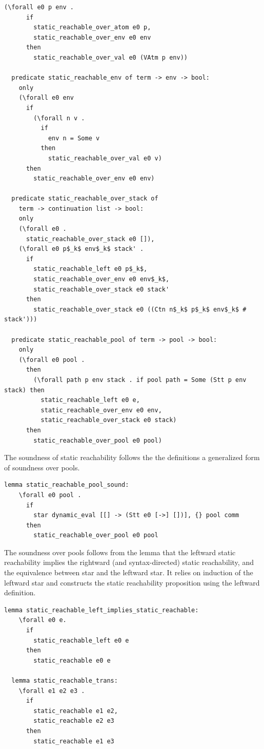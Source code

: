 \documentclass[10pt]{article}
\begin{document}
\begin{lstlisting}[language=logic, mathescape]
    (\forall e0 p env .
      if
        static_reachable_over_atom e0 p, 
        static_reachable_over_env e0 env
      then
        static_reachable_over_val e0 (VAtm p env))

  predicate static_reachable_env of term -> env -> bool:
    only
    (\forall e0 env
      if
        (\forall n v .
          if
            env n = Some v
          then
            static_reachable_over_val e0 v)
      then
        static_reachable_over_env e0 env)

  predicate static_reachable_over_stack of
    term -> continuation list -> bool:
    only
    (\forall e0 .
      static_reachable_over_stack e0 []),
    (\forall e0 p$_k$ env$_k$ stack' .
      if
        static_reachable_left e0 p$_k$, 
        static_reachable_over_env e0 env$_k$,
        static_reachable_over_stack e0 stack' 
      then
        static_reachable_over_stack e0 ((Ctn n$_k$ p$_k$ env$_k$ # stack')))

  predicate static_reachable_pool of term -> pool -> bool:
    only
    (\forall e0 pool .
      then
        (\forall path p env stack . if pool path = Some (Stt p env stack) then 
          static_reachable_left e0 e, 
          static_reachable_over_env e0 env, 
          static_reachable_over_stack e0 stack)
      then
        static_reachable_over_pool e0 pool)

  \end{lstlisting}

The soundness of static reachability follows the the definitions
a generalized form of soundness over pools.

\begin{lstlisting}[language=logic, mathescape]
  lemma static_reachable_pool_sound:
    \forall e0 pool .
      if
        star dynamic_eval [[] -> (Stt e0 [->] [])], {} pool comm 
      then
        static_reachable_over_pool e0 pool

  \end{lstlisting}


The soundness over pools follows from the lemma that the leftward
static reachability implies the rightward (and syntax-directed) static reachability,
and the equivalence between star and the leftward star.  It relies on induction of the
leftward star and constructs the static reachability
proposition using the leftward definition.  

\begin{lstlisting}[language=logic, mathescape]
  lemma static_reachable_left_implies_static_reachable:
    \forall e0 e. 
      if
        static_reachable_left e0 e
      then
        static_reachable e0 e

  lemma static_reachable_trans:
    \forall e1 e2 e3 .
      if 
        static_reachable e1 e2,
        static_reachable e2 e3
      then
        static_reachable e1 e3
  \end{lstlisting}
\end{document}
